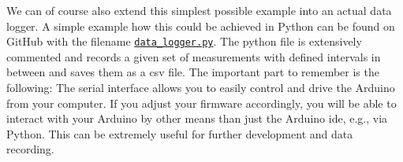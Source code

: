 We can of course also extend this simplest possible example into an actual data logger. A simple example how this could be achieved in Python can be found on GitHub with the filename \href{https://github.com/galactic-forensics/workshop_arduino_electronics/blob/main/further_examples/data_logger/data_logger.py}{\lstinline{data_logger.py}}. The python file is extensively commented and records a given set of measurements with defined intervals in between and saves them as a \ac{csv} file. The important part to remember is the following: The serial interface allows you to easily control and drive the Arduino from your computer. If you adjust your firmware accordingly, you will be able to interact with your Arduino by other means than just the Arduino \ac{ide}, e.g., via Python. This can be extremely useful for further development and data recording.